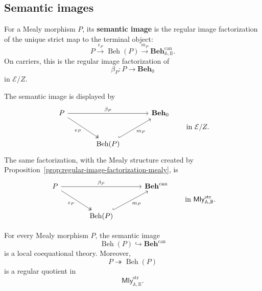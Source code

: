 \subsection{Semantic images}
\label{subsec:semantic-images}

\begin{definition}
\label{def:semantic-image}
    For a Mealy morphism \(P\), its \textbf{semantic image} is the regular
    image factorization of the unique strict map to the terminal object:
    \[
        P\xrightarrow{e_P}\operatorname{Beh}(P)
        \xrightarrow{m_P}
        \mathbf{Beh}^{\mathrm{can}}_{\mathbb A,\mathbb B}.
    \]
    On carriers, this is the regular image factorization of
    \[
        \beta_P:P\to\mathbf{Beh}_0
    \]
    in \(\mathcal E/Z\).
\end{definition}

The semantic image is displayed by
\[
\begin{tikzcd}[column sep=large, row sep=large]
    P
        \arrow[rr, "\beta_P"]
        \arrow[dr, two heads, "e_P"']
    &&
    \mathbf{Beh}_0
    \\
    &
    \operatorname{Beh}(P)
        \arrow[ur, hook, "m_P"']
    &
\end{tikzcd}
\qquad
\text{in }\mathcal E/Z.
\]
The same factorization, with the Mealy structure created by
Proposition~\ref{prop:regular-image-factorization-mealy}, is
\[
\begin{tikzcd}[column sep=large, row sep=large]
    P
        \arrow[rr, "\beta_P"]
        \arrow[dr, two heads, "e_P"']
    &&
    \mathbf{Beh}^{\mathrm{can}}
    \\
    &
    \operatorname{Beh}(P)
        \arrow[ur, hook, "m_P"']
    &
\end{tikzcd}
\qquad
\text{in }\mathsf{Mly}^{\mathrm{str}}_{\mathbb A,\mathbb B}.
\]

\begin{corollary}
\label{cor:semantic-images-are-coeq-theories}
    For every Mealy morphism \(P\), the semantic image
    \[
        \operatorname{Beh}(P)\hookrightarrow\mathbf{Beh}^{\mathrm{can}}
    \]
    is a local coequational theory. Moreover,
    \[
        P\twoheadrightarrow\operatorname{Beh}(P)
    \]
    is a regular quotient in
    \[
        \mathsf{Mly}^{\mathrm{str}}_{\mathbb A,\mathbb B}.
    \]
\end{corollary}

